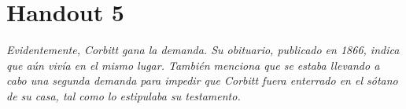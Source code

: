 \chapter{Handout 5}

\emph{Evidentemente, Corbitt gana la demanda. Su obituario, publicado en 1866,
indica que aún vivía en el mismo lugar. También menciona que se estaba llevando
a cabo una segunda demanda para impedir que Corbitt fuera enterrado en el sótano
de su casa, tal como lo estipulaba su testamento.}

